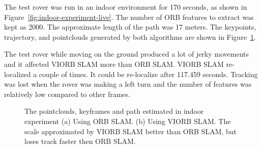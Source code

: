 The test rover was run in an indoor environment for 170 seconds, as shown in Figure~\ref{fig:indoor-experiment-live}. The number of ORB features to extract was kept as 2000. The approximate length of the path was 17 meters. The keypoints, trajectory, and pointclouds generated by both algorithms are shown in Figure~\ref{fig:indoor-path-visualization}.

The test rover while moving on the ground produced a lot of jerky movements and it affected VIORB SLAM more than ORB SLAM. VIORB SLAM re-localized a couple of times. It could be re-localize after 117.459 seconds. Tracking was lost when the rover was making a left turn and the number of features was relatively low compared to other frames.

\begin{figure}[h]
	
	\caption[Indoor experiment.]{\small 
		The pointclouds, keyframes and path estimated in indoor experiment (a) Using ORB SLAM. (b) Using VIORB SLAM. The scale approximated by VIORB SLAM better than ORB SLAM, but loses track faster then ORB SLAM.}
	\label{fig:indoor-path-visualization}
	
\end{figure}

